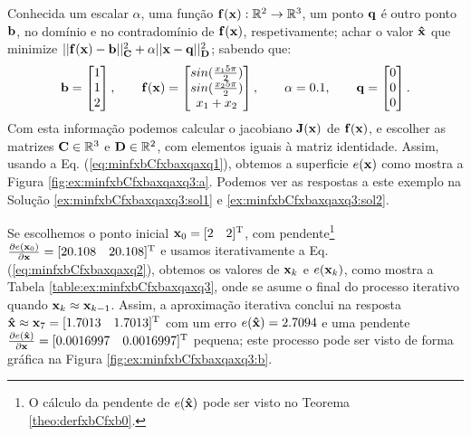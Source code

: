 \begin{example}
\label{ex:minfxbCfxbaxqaxq1}
Conhecida um escalar $\alpha$, uma função $\VECTOR{f}(\VECTOR{x}) : \mathbb{R}^{2} \rightarrow \mathbb{R}^{3}$,
um ponto $\VECTOR{q}$
é outro ponto $\VECTOR{b}$, no domínio e no contradomínio de $\VECTOR{f}(\VECTOR{x})$, respetivamente;
achar o valor $\VECTOR{\hat{x}}$ que minimize 
$||\VECTOR{f}(\VECTOR{x})-\VECTOR{b}||_{\MATRIX{C}}^2+\alpha||\VECTOR{x}-\VECTOR{q}||_{\MATRIX{D}}^2$;
sabendo que:
\begin{equation}
\VECTOR{b}=\begin{bmatrix}
1\\
1\\
2
\end{bmatrix},
\qquad 
\VECTOR{f}(\VECTOR{x})=\begin{bmatrix}
sin(\frac{x_1 5 \pi}{2})\\
sin(\frac{x_2 5 \pi}{2})\\
x_1+x_2
\end{bmatrix},
\qquad
\alpha=0.1,
\qquad
\VECTOR{q}=\begin{bmatrix}
0\\
0\\
0
\end{bmatrix}.
\end{equation}
Com esta informação podemos calcular o jacobiano $\MATRIX{J}(\VECTOR{x})$ de $\VECTOR{f}(\VECTOR{x})$,
 e escolher as matrizes $\MATRIX{C} \in \mathbb{R}^{3}$ e $\MATRIX{D} \in \mathbb{R}^{2}$, 
com elementos iguais à  matriz identidade. 
Assim, usando a Eq. (\ref{eq:minfxbCfxbaxqaxq1}),
obtemos a superficie $e(\VECTOR{x})$ como mostra a Figura \ref{fig:ex:minfxbCfxbaxqaxq3:a}.
Podemos ver as respostas a este exemplo na Solução \ref{ex:minfxbCfxbaxqaxq3:sol1} e \ref{ex:minfxbCfxbaxqaxq3:sol2}.
\end{example}

\begin{SolutionT}
\label{ex:minfxbCfxbaxqaxq3:sol1}
Se escolhemos o ponto inicial $\VECTOR{x}_0=[2\quad 2]^{\transpose}$,
com pendente\footnote{O cálculo da
pendente de $e(\VECTOR{\hat{x}})$ pode ser visto no Teorema \ref{theo:derfxbCfxb0}.} 
$\frac{\partial e(\VECTOR{x}_0)}{\partial \VECTOR{x} }=[20.108\quad 20.108]^{\transpose}$ e 
usamos iterativamente a Eq. (\ref{eq:minfxbCfxbaxqaxq2}), obtemos os valores 
de $\VECTOR{x}_k$ e $e(\VECTOR{x}_k)$, como mostra a Tabela \ref{table:ex:minfxbCfxbaxqaxq3},
onde se asume o final do processo iterativo quando $\VECTOR{x}_k \approx \VECTOR{x}_{k-1}$.
Assim, a aproximação iterativa conclui na resposta 
$\VECTOR{\hat{x}}\approx \VECTOR{x}_{7} =[1.7013\quad 1.7013]^{\transpose}$
com um erro $e(\VECTOR{\hat{x}})=2.7094$ e uma pendente
$\frac{\partial e(\VECTOR{\hat{x}})}{\partial \VECTOR{x} }=[0.0016997\quad 0.0016997]^{\transpose}$
pequena;
este processo pode ser visto de forma gráfica na Figura \ref{fig:ex:minfxbCfxbaxqaxq3:b}.
\end{SolutionT}

